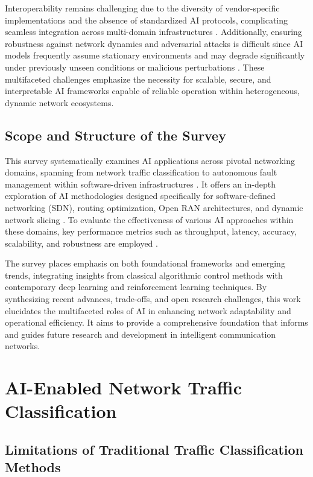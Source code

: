 Interoperability remains challenging due to the diversity of vendor-specific implementations and the absence of standardized AI protocols, complicating seamless integration across multi-domain infrastructures \cite{ref30,ref48}. Additionally, ensuring robustness against network dynamics and adversarial attacks is difficult since AI models frequently assume stationary environments and may degrade significantly under previously unseen conditions or malicious perturbations \cite{ref49,ref50,ref53}. These multifaceted challenges emphasize the necessity for scalable, secure, and interpretable AI frameworks capable of reliable operation within heterogeneous, dynamic network ecosystems.

\subsection{Scope and Structure of the Survey}

This survey systematically examines AI applications across pivotal networking domains, spanning from network traffic classification to autonomous fault management within software-driven infrastructures \cite{ref31,ref32}. It offers an in-depth exploration of AI methodologies designed specifically for software-defined networking (SDN), routing optimization, Open RAN architectures, and dynamic network slicing \cite{ref33,ref34,ref35}. To evaluate the effectiveness of various AI approaches within these domains, key performance metrics such as throughput, latency, accuracy, scalability, and robustness are employed \cite{ref51,ref52}. 

The survey places emphasis on both foundational frameworks and emerging trends, integrating insights from classical algorithmic control methods with contemporary deep learning and reinforcement learning techniques. By synthesizing recent advances, trade-offs, and open research challenges, this work elucidates the multifaceted roles of AI in enhancing network adaptability and operational efficiency. It aims to provide a comprehensive foundation that informs and guides future research and development in intelligent communication networks.

\section{AI-Enabled Network Traffic Classification}

\subsection{Limitations of Traditional Traffic Classification Methods}

